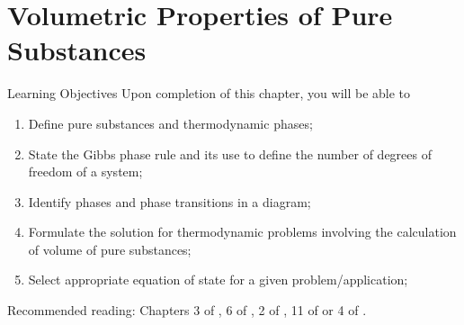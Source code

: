 \chapter{Volumetric Properties of Pure Substances}\label{Chapter:VolumetricPropertiesPureSubstances}

   \begin{LearningObjectivesBlock}{Learning Objectives}
      Upon completion of this chapter, you will be able to
        \begin{enumerate}
           \item Define pure substances and thermodynamic phases;
           \item State the Gibbs phase rule and its use to define the number of degrees of freedom of a system;
           \item Identify phases and phase transitions in a diagram;
           \item Formulate the solution for thermodynamic problems involving the calculation of volume of pure substances;
           \item Select appropriate equation of state for a given problem/application;
        \end{enumerate}
\medskip
     Recommended reading: Chapters 3 of \citet{SmithVanNess_Book}, 6 of \citet{Sandler_Book}, 2 of \citet{Borgnakke_Book}, 11 of \citet{Moran_Book} or 4 of \citet{Atkins_Book}.
   \end{LearningObjectivesBlock}

  
